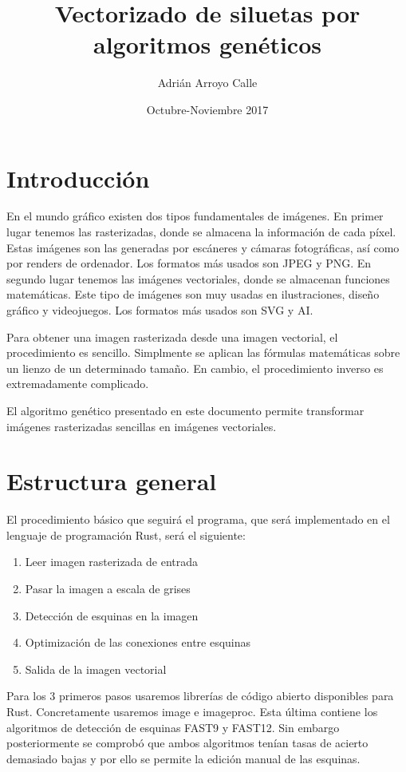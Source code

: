 \documentclass{report}
\title{Vectorizado de siluetas por algoritmos genéticos}
\author{Adrián Arroyo Calle}
\date{ Octubre-Noviembre 2017}
\begin{document}
\maketitle

\chapter{Introducción}
En el mundo gráfico existen dos tipos fundamentales de imágenes.
En primer lugar tenemos las rasterizadas, donde se almacena la información de cada píxel.
Estas imágenes son las generadas por escáneres y cámaras fotográficas, así como por renders
de ordenador. Los formatos más usados son JPEG y PNG. En segundo lugar tenemos las imágenes
vectoriales, donde se almacenan funciones matemáticas. Este tipo de imágenes son muy usadas
en ilustraciones, diseño gráfico y videojuegos. Los formatos más usados son SVG y AI. 

Para obtener una imagen rasterizada desde una imagen vectorial, el procedimiento es
sencillo. Simplmente se aplican las fórmulas matemáticas sobre un lienzo de un determinado
tamaño. En cambio, el procedimiento inverso es extremadamente complicado. 

El algoritmo genético presentado en este documento permite transformar imágenes rasterizadas
sencillas en imágenes vectoriales.

\chapter{Estructura general}

El procedimiento básico que seguirá el programa, que será implementado en el lenguaje 
de programación Rust\cite{Matsakis:2014:RL:2692956.2663188}, será el siguiente:

\begin{enumerate}
	\item Leer imagen rasterizada de entrada
	\item Pasar la imagen a escala de grises
	\item Detección de esquinas en la imagen
	\item Optimización de las conexiones entre esquinas
	\item Salida de la imagen vectorial
\end{enumerate}

Para los 3 primeros pasos usaremos librerías de código abierto disponibles para Rust. Concretamente
usaremos image e imageproc. Esta última contiene los algoritmos de detección de esquinas FAST9 y 
FAST12. Sin embargo posteriormente se comprobó que ambos algoritmos tenían tasas de acierto
demasiado bajas y por ello se permite la edición manual de las esquinas.
\end{document}
